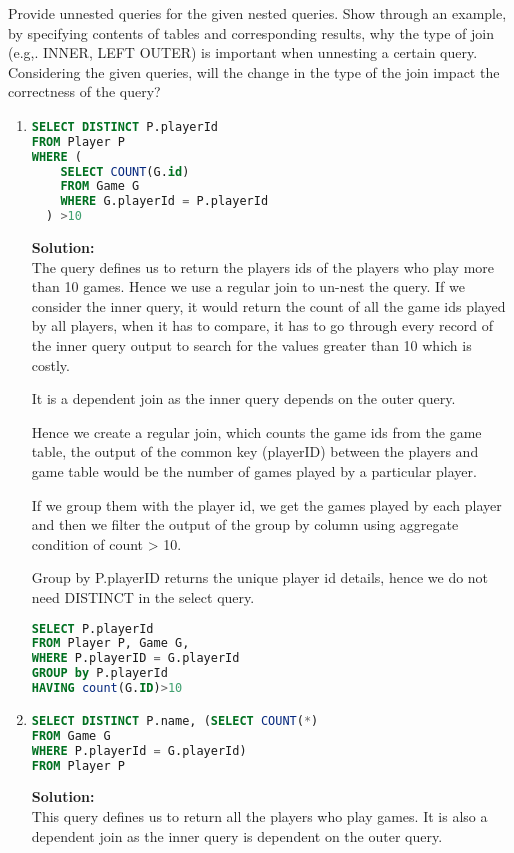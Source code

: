 \newpage


Provide unnested queries for the given nested queries. Show through an example, by specifying contents of tables and corresponding results, why the type of join (e.g,. INNER, LEFT OUTER) is important when unnesting a certain query. Considering the given queries, will the change in the type of the join impact the correctness of the query?

\begin{enumerate}
  \item
          \begin{lstlisting}[language=sql]
SELECT DISTINCT P.playerId
FROM Player P
WHERE (
    SELECT COUNT(G.id)
    FROM Game G
    WHERE G.playerId = P.playerId
  ) >10
\end{lstlisting}
{\bf Solution:}\\
The query defines us to return the players  ids of the players who play more than 10 games.
Hence we use a regular join to un-nest the query. If we consider the inner query, it would return the count of all the game ids played by all players, when it has to compare, it has to go through every record of the inner query output to search for the values greater than 10 which is costly.

It is a dependent join as the inner query depends on the outer query. 

Hence we create a regular join, which counts the game ids from the game table, the output of the common key (playerID) between the players and game table would be the number of games played by a particular player.

If we group them with the player id, we get the games played by each player and then we filter the output of the group by column using aggregate condition of count > 10.

Group by P.playerID returns the unique player id details, hence we do not need DISTINCT in the select query.

\begin{lstlisting}[language=sql]
SELECT P.playerId
FROM Player P, Game G,
WHERE P.playerID = G.playerId
GROUP by P.playerId
HAVING count(G.ID)>10
\end{lstlisting}

  \item

          \begin{lstlisting}[language=sql]
SELECT DISTINCT P.name, (SELECT COUNT(*)
FROM Game G
WHERE P.playerId = G.playerId)
FROM Player P
\end{lstlisting}
\newpage
{\bf Solution:}\\
This query defines us to return all the players who play games. It is also a dependent join as the inner query is dependent on the outer query.


\end{enumerate}
